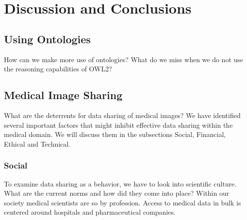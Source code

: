 
\chapter{Discussion and Conclusions} %

\label{Chapter6} %



\section{Using Ontologies}

How can we make more use of ontologies? What do we
miss when we do not use the reasoning capabilities of
OWL2?


\section{Medical Image Sharing}

What are the deterrents for data sharing of
medical images? We have identified several
important factors that might inhibit effective data sharing within the
medical domain. We will discuss them in the subsections Social,
Financial, Ethical and Technical.

\subsection{Social}
To examine data sharing as a behavior, we have to look into scientific
culture. What
are the current norms and how did they come into place?  Within our
society medical scientists are so by profession. Access to medical
data in bulk is centered around hospitals and
pharmaceutical companies.

